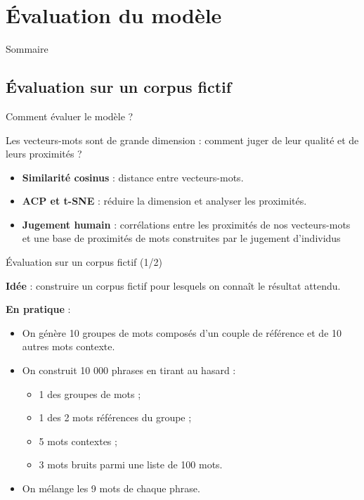 \documentclass[10pt,xcolor=table,color={dvipsnames,usenames},ignorenonframetext,usepdftitle=false,french]{beamer}
\begin{document}
\hypertarget{uxe9valuation-du-moduxe8le}{%
\section{Évaluation du modèle}\label{uxe9valuation-du-moduxe8le}}

\begin{frame}{Sommaire}
\protect\hypertarget{sommaire-1}{}


\end{frame}

\hypertarget{uxe9valuation-sur-un-corpus-fictif}{%
\subsection{Évaluation sur un corpus
fictif}\label{uxe9valuation-sur-un-corpus-fictif}}

\begin{frame}{Comment évaluer le modèle ?}
\protect\hypertarget{comment-uxe9valuer-le-moduxe8le}{}

Les vecteurs-mots sont de grande dimension : comment juger de leur
qualité et de leurs proximités ?

\begin{itemize}
\item
  \textbf{Similarité cosinus} : distance entre vecteurs-mots.
\item
  \textbf{ACP et t-SNE} : réduire la dimension et analyser les
  proximités.
\item
  \textbf{Jugement humain} : corrélations entre les proximités de nos
  vecteurs-mots et une base de proximités de mots construites par le
  jugement d'individus
\end{itemize}

\end{frame}

\begin{frame}{Évaluation sur un corpus fictif (1/2)}
\protect\hypertarget{uxe9valuation-sur-un-corpus-fictif-12}{}

\textbf{Idée} : construire un corpus fictif pour lesquels on connaît le
résultat attendu.

\textbf{En pratique} :

\begin{itemize}
\item On génère 10 groupes de mots composés d'un couple de référence et de 10 autres mots contexte.
\item On construit 10 000 phrases en tirant au hasard :
\begin{itemize}
\item 1 des groupes de mots ;
\item 1 des 2 mots \og références \fg{} du groupe ;
\item 5 mots contextes ;
\item 3 mots bruits parmi une liste de 100 mots.
\end{itemize}
\item On mélange les 9 mots de chaque phrase.
\end{itemize}

\end{frame}
\end{document}
